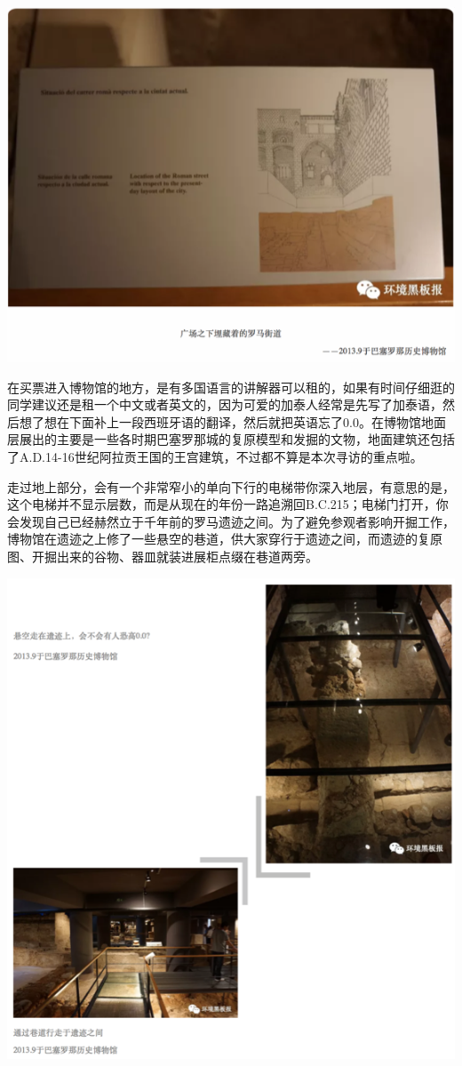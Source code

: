 \documentclass[]{book}
\begin{document}
\includegraphics[width=8.33in]{images/xt14}

在买票进入博物馆的地方，是有多国语言的讲解器可以租的，如果有时间仔细逛的同学建议还是租一个中文或者英文的，因为可爱的加泰人经常是先写了加泰语，然后想了想在下面补上一段西班牙语的翻译，然后就把英语忘了0.0。在博物馆地面层展出的主要是一些各时期巴塞罗那城的复原模型和发掘的文物，地面建筑还包括了A.D.14-16世纪阿拉贡王国的王宫建筑，不过都不算是本次寻访的重点啦。

走过地上部分，会有一个非常窄小的单向下行的电梯带你深入地层，有意思的是，这个电梯并不显示层数，而是从现在的年份一路追溯回B.C.215；电梯门打开，你会发现自己已经赫然立于千年前的罗马遗迹之间。为了避免参观者影响开掘工作，博物馆在遗迹之上修了一些悬空的巷道，供大家穿行于遗迹之间，而遗迹的复原图、开掘出来的谷物、器皿就装进展柜点缀在巷道两旁。

\includegraphics[width=7.78in]{images/xt15}
\end{document}

